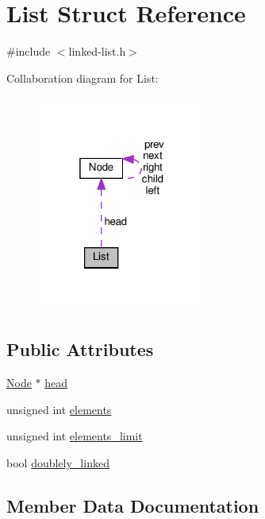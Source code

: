 \hypertarget{structList}{}\section{List Struct Reference}
\label{structList}


{\ttfamily \#include $<$linked-\/list.\+h$>$}



Collaboration diagram for List\+:
\nopagebreak
\begin{figure}[H]
\begin{center}
\leavevmode
\includegraphics[width=160pt]{structList__coll__graph}
\end{center}
\end{figure}
\subsection*{Public Attributes}
\begin{DoxyCompactItemize}
\item 
\hyperlink{structNode}{Node} $\ast$ \hyperlink{structList_a443db628080a04a1dacfd3015d164735}{head}
\item 
unsigned int \hyperlink{structList_a388b6c8fff13e506d27071a318c9004f}{elements}
\item 
unsigned int \hyperlink{structList_a3858093f64846444abc72e9b31e00e41}{elements\+\_\+limit}
\item 
bool \hyperlink{structList_a0a6b9ea561ca0cff5c3e7673717676c2}{doublely\+\_\+linked}
\end{DoxyCompactItemize}


\subsection{Member Data Documentation}
\mbox{\label{structList_a0a6b9ea561ca0cff5c3e7673717676c2}} 
